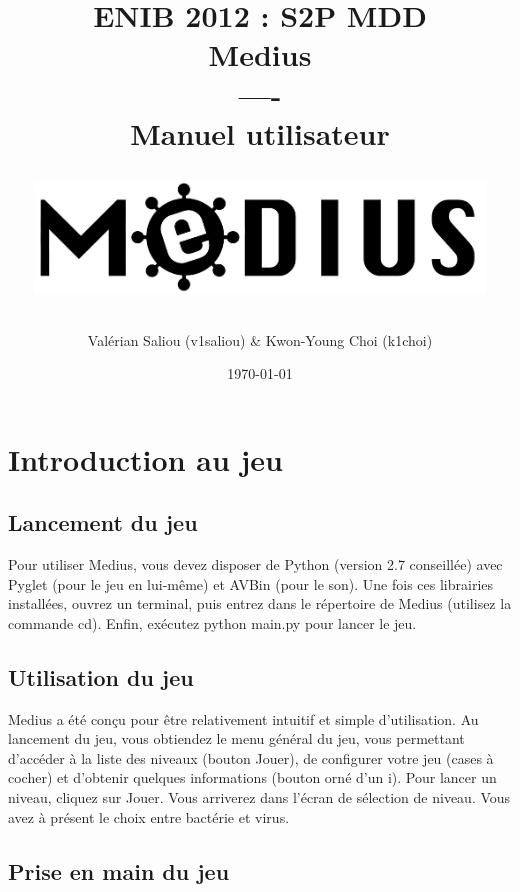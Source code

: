 \documentclass{article}
\title{{\Huge \bf ENIB 2012 : S2P  MDD} \\
\vspace*{2cm}
{\Huge \bf Medius} \\----\\ Manuel utilisateur \\
\vspace*{2cm}
\centerline{\includegraphics[height=3cm]{logomedius.jpg}}
}
\author{Valérian Saliou (v1saliou) \& Kwon-Young Choi (k1choi)}
\date\today
\begin{document}
\maketitle

\newpage

\section{Introduction au jeu}

\subsection{Lancement du jeu}

Pour utiliser Medius, vous devez disposer de Python (version 2.7 conseillée) avec Pyglet (pour le jeu en lui-même) et AVBin (pour le son).
\newline\newline
Une fois ces librairies installées, ouvrez un terminal, puis entrez dans le répertoire de Medius (utilisez la commande cd).
\newline\newline
Enfin, exécutez python main.py pour lancer le jeu.
\newline\newline

\subsection{Utilisation du jeu}

Medius a été conçu pour être relativement intuitif et simple d'utilisation.
\newline\newline
Au lancement du jeu, vous obtiendez le menu général du jeu, vous permettant d'accéder à la liste des niveaux (bouton Jouer), de configurer votre jeu (cases à cocher) et d'obtenir quelques informations (bouton orné d'un i).
\newline\newline
Pour lancer un niveau, cliquez sur Jouer. Vous arriverez dans l'écran de sélection de niveau. Vous avez à présent le choix entre bactérie et virus.
\newline\newline

\subsection{Prise en main du jeu}
\end{document}
